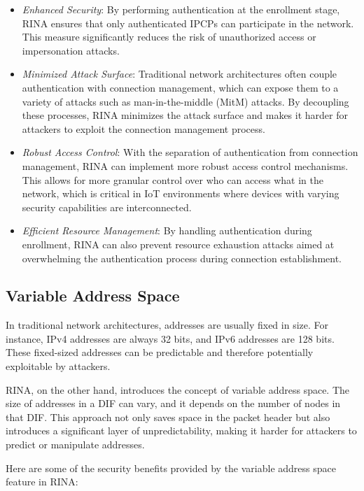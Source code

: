 \documentclass{ieeeaccess}
\begin{document}
\begin{itemize}
	\item \textit{Enhanced Security}: By performing authentication at the enrollment stage, RINA ensures that only authenticated IPCPs can participate in the network. This measure significantly reduces the risk of unauthorized access or impersonation attacks.
	\item \textit{Minimized Attack Surface}: Traditional network architectures often couple authentication with connection management, which can expose them to a variety of attacks such as man-in-the-middle (MitM) attacks. By decoupling these processes, RINA minimizes the attack surface and makes it harder for attackers to exploit the connection management process.
	\item \textit{Robust Access Control}: With the separation of authentication from connection management, RINA can implement more robust access control mechanisms. This allows for more granular control over who can access what in the network, which is critical in IoT environments where devices with varying security capabilities are interconnected.
	\item \textit{Efficient Resource Management}: By handling authentication during enrollment, RINA can also prevent resource exhaustion attacks aimed at overwhelming the authentication process during connection establishment.
\end{itemize}

\subsection{Variable Address Space}

In traditional network architectures, addresses are usually fixed in size. For instance, IPv4 addresses are always 32 bits, and IPv6 addresses are 128 bits. These fixed-sized addresses can be predictable and therefore potentially exploitable by attackers.

RINA, on the other hand, introduces the concept of variable address space. The size of addresses in a DIF can vary, and it depends on the number of nodes in that DIF. This approach not only saves space in the packet header but also introduces a significant layer of unpredictability, making it harder for attackers to predict or manipulate addresses.

Here are some of the security benefits provided by the variable address space feature in RINA:
\end{document}
